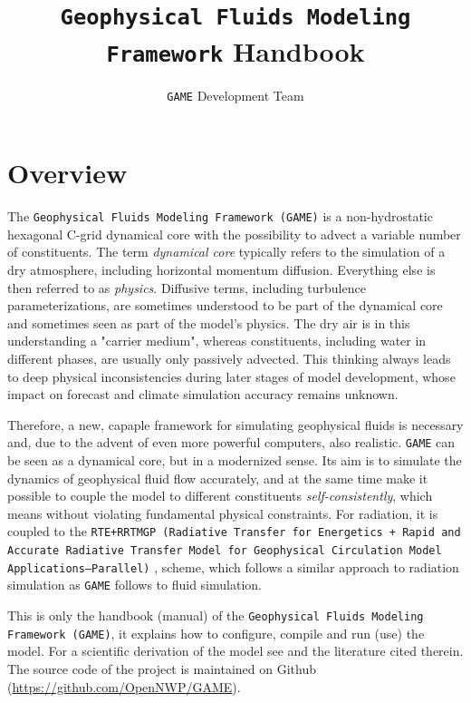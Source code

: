 \documentclass[10pt]{report}
\title{\texttt{Geophysical Fluids Modeling Framework} Handbook}
\author{\texttt{GAME} Development Team}
\date{}
\begin{document}
\maketitle

\tableofcontents

\chapter{Overview}
\label{chap:overview}

The \texttt{Geophysical Fluids Modeling Framework (GAME)} is a non-hydrostatic hexagonal C-grid dynamical core with the possibility to advect a variable number of constituents. The term \textit{dynamical core} typically refers to the simulation of a dry atmosphere, including horizontal momentum diffusion. Everything else is then referred to as \textit{physics}. Diffusive terms, including turbulence parameterizations, are sometimes understood to be part of the dynamical core and sometimes seen as part of the model's physics. The dry air is in this understanding a "carrier medium", whereas constituents, including water in different phases, are usually only passively advected. This thinking always leads to deep physical inconsistencies during later stages of model development, whose impact on forecast and climate simulation accuracy remains unknown.

Therefore, a new, capaple framework for simulating geophysical fluids is necessary and, due to the advent of even more powerful computers, also realistic. \texttt{GAME} can be seen as a dynamical core, but in a modernized sense. Its aim is to simulate the dynamics of geophysical fluid flow accurately, and at the same time make it possible to couple the model to different constituents \textit{self-consistently}, which means without violating fundamental physical constraints. For radiation, it is coupled to the \texttt{RTE+RRTMGP (Radiative Transfer for Energetics + Rapid and Accurate Radiative Transfer Model for Geophysical Circulation Model Applications—Parallel)} \cite{doi:10.1029/2019MS001621}, \cite{rte-rrtmgp-github} scheme, which follows a similar approach to radiation simulation as \texttt{GAME} follows to fluid simulation.

This is only the handbook (manual) of the \texttt{Geophysical Fluids Modeling Framework (GAME)}, it explains how to configure, compile and run (use) the model. For a scientific derivation of the model see \cite{kompendium} and the literature cited therein. The source code of the project is maintained on Github (\url{https://github.com/OpenNWP/GAME}).
\end{document}

